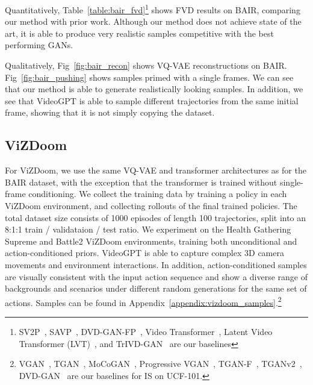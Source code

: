 Quantitatively, Table~\ref{table:bair_fvd}\footnote{SV2P~\citep{babaeizadeh2017stochastic}, SAVP~\citep{lee2018stochastic}, DVD-GAN-FP~\citep{clark2019adversarial}, Video Transformer~\citep{weissenborn2019scaling}, Latent Video Transformer (LVT)~\citep{rakhimov2020latent}, and TrIVD-GAN~\citep{luc2020transformation} are our baselines} shows FVD results on BAIR, comparing our method with prior work. Although our method does not achieve state of the art, it is able to produce very realistic samples competitive with the best performing GANs.

Qualitatively, Fig~\ref{fig:bair_recon} shows VQ-VAE reconstructions on BAIR. Fig~\ref{fig:bair_pushing} shows samples primed with a single frames. We can see that our method is able to generate realistically looking samples. In addition, we see that VideoGPT is able to sample different trajectories from the same initial frame, showing that it is not simply copying the dataset.  

\subsection{ViZDoom}
For ViZDoom, we use the same VQ-VAE and transformer architectures as for the BAIR dataset, with the exception that the transformer is trained without single-frame conditioning. We collect the training data by training a policy in each ViZDoom environment, and collecting rollouts of the final trained policies. The total dataset size consists of 1000 episodes of length 100 trajectories, split into an 8:1:1 train / validataion / test ratio. We experiment on the Health Gathering Supreme and Battle2 ViZDoom environments, training both unconditional and action-conditioned priors. VideoGPT is able to capture complex 3D camera movements and environment interactions. In addition, action-conditioned samples are visually consistent with the input action sequence and show a diverse range of backgrounds and scenarios under different random generations for the same set of actions. Samples can be found in Appendix~\ref{appendix:vizdoom_samples}.\footnote{VGAN~\citep{vondrick2016generating}, TGAN~\cite{saito2017temporal}, MoCoGAN~\citep{tulyakov2018mocogan}, Progressive VGAN~\cite{acharya2018towards}, TGAN-F~\citep{kahembwe2020lower}, TGANv2~\cite{saito2018tganv2}, DVD-GAN~\cite{clark2019adversarial} are our baselines for IS on UCF-101.}


